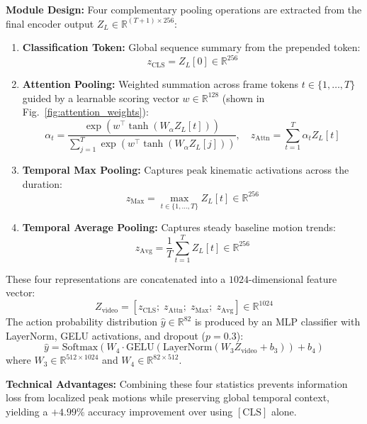 \documentclass[conference]{IEEEtran}
\begin{document}
\textbf{Module Design:} Four complementary pooling operations are extracted from the final encoder output $Z_L \in \mathbb{R}^{(T+1) \times 256}$:
\begin{enumerate}
    \item \textbf{Classification Token:} Global sequence summary from the prepended token:
    \begin{equation}
    z_{\text{CLS}} = Z_L[0] \in \mathbb{R}^{256}
    \end{equation}
    \item \textbf{Attention Pooling:} Weighted summation across frame tokens $t \in \{1, \dots, T\}$ guided by a learnable scoring vector $w \in \mathbb{R}^{128}$ (shown in Fig.~\ref{fig:attention_weights}):
    \begin{equation}
    \alpha_t = \frac{\exp(w^\top \tanh(W_\alpha Z_L[t]))}{\sum_{j=1}^T \exp(w^\top \tanh(W_\alpha Z_L[j]))}, \quad z_{\text{Attn}} = \sum_{t=1}^T \alpha_t Z_L[t]
    \end{equation}
    \item \textbf{Temporal Max Pooling:} Captures peak kinematic activations across the duration:
    \begin{equation}
    z_{\text{Max}} = \max_{t \in \{1, \dots, T\}} Z_L[t] \in \mathbb{R}^{256}
    \end{equation}
    \item \textbf{Temporal Average Pooling:} Captures steady baseline motion trends:
    \begin{equation}
    z_{\text{Avg}} = \frac{1}{T} \sum_{t=1}^T Z_L[t] \in \mathbb{R}^{256}
    \end{equation}
\end{enumerate}

These four representations are concatenated into a $1024$-dimensional feature vector:
\begin{equation}
Z_{\text{video}} = [z_{\text{CLS}}; \; z_{\text{Attn}}; \; z_{\text{Max}}; \; z_{\text{Avg}}] \in \mathbb{R}^{1024}
\end{equation}
The action probability distribution $\hat{y} \in \mathbb{R}^{82}$ is produced by an MLP classifier with LayerNorm, GELU activations, and dropout ($p=0.3$):
\begin{equation}
\hat{y} = \text{Softmax}(W_4 \cdot \text{GELU}(\text{LayerNorm}(W_3 Z_{\text{video}} + b_3)) + b_4)
\end{equation}
where $W_3 \in \mathbb{R}^{512 \times 1024}$ and $W_4 \in \mathbb{R}^{82 \times 512}$.

\textbf{Technical Advantages:} Combining these four statistics prevents information loss from localized peak motions while preserving global temporal context, yielding a $+4.99\%$ accuracy improvement over using $[\text{CLS}]$ alone.
\end{document}
